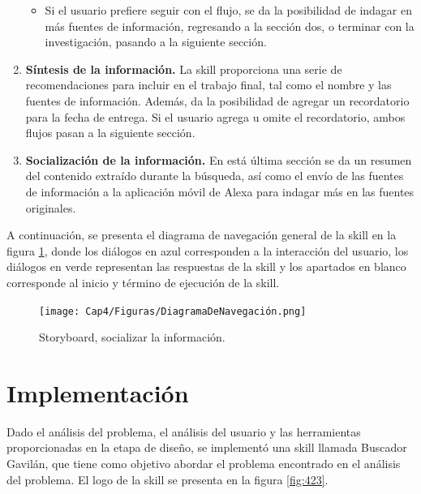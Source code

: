 \begin{enumerate}
\begin{itemize}
    \item Si el usuario prefiere seguir con el flujo, se da la posibilidad de indagar en más fuentes de información, regresando a la sección dos, o terminar con la investigación, pasando a la siguiente sección.
  \end{itemize}
  \item \textbf{Síntesis de la información.} La skill proporciona una serie de recomendaciones para incluir en el trabajo final, tal como el nombre y las fuentes de información. Además, da la posibilidad de agregar un recordatorio para la fecha de entrega. Si el usuario agrega u omite el recordatorio, ambos flujos pasan a la siguiente sección.
  \item \textbf{Socialización de la información.} En está última sección se da un resumen del contenido extraído durante la búsqueda, así como el envío de las fuentes de información a la aplicación móvil de Alexa para indagar más en las fuentes originales.
\end{enumerate}

A continuación, se presenta el diagrama de navegación general de la skill en la figura \ref{fig:422}, donde los diálogos en azul corresponden a la interacción del usuario, los diálogos en verde representan las respuestas de la skill y los apartados en blanco corresponde al inicio y término de ejecución de la skill.

\begin{figure}
  \centering
  \texttt{[image: Cap4/Figuras/DiagramaDeNavegación.png]}
  \caption{Storyboard, socializar la información.}
  \label{fig:422}
\end{figure}


\section{Implementación}
\label{ImplementacioncapIV}

Dado el análisis del problema, el análisis del usuario y las herramientas proporcionadas en la etapa de diseño, se implementó una skill llamada Buscador Gavilán, que tiene como objetivo abordar el problema encontrado en el análisis del problema. El logo de la skill se presenta en la figura \ref{fig:423}.

